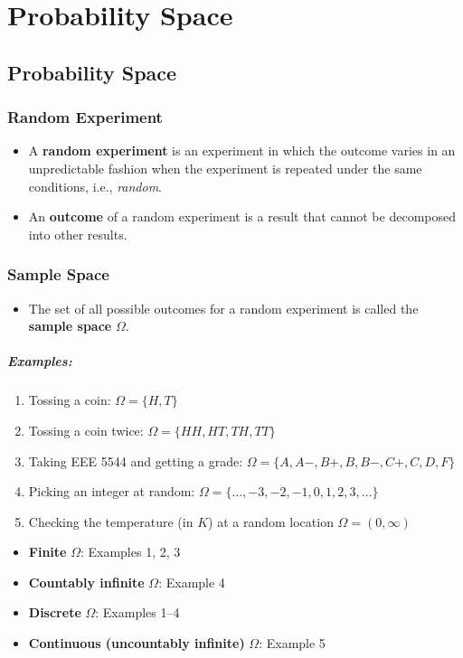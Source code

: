 \section{Probability Space}

\subsection{Probability Space}

\subsubsection{Random Experiment}

\begin{itemize}
\item A \textbf{random experiment} is an experiment in which the outcome varies in an unpredictable fashion when the experiment is repeated under the same conditions, i.e., \textit{random}.
\item An \textbf{outcome} of a random experiment is a result that cannot be decomposed into other results.
\end{itemize}

\subsubsection{Sample Space}

\begin{itemize}
\item The set of all possible outcomes for a random experiment is called the \textbf{sample space} $\Omega$.
\end{itemize}

\subparagraph{Examples:}

\begin{enumerate}[resume]
\item Tossing a coin: $\Omega=\{H, T\}$
\item Tossing a coin twice: $\Omega=\{H H, H T, T H, T T\}$
\item Taking EEE 5544 and getting a grade: $\Omega=\{A, A -, B+, B, B -, C+, C, D, F\}$
\item Picking an integer at random: $\Omega=\{\ldots, -3, -2, -1,0,1,2,3, \ldots \}$
\item Checking the temperature (in $K$) at a random location $\Omega=(0, \infty)$
\end{enumerate}

\begin{itemize}
\item \textbf{Finite} $\Omega$: Examples 1, 2, 3
\item \textbf{Countably infinite} $\Omega$: Example 4
\item \textbf{Discrete} $\Omega$: Examples 1--4
\item \textbf{Continuous (uncountably infinite)} $\Omega$: Example 5
\end{itemize}

